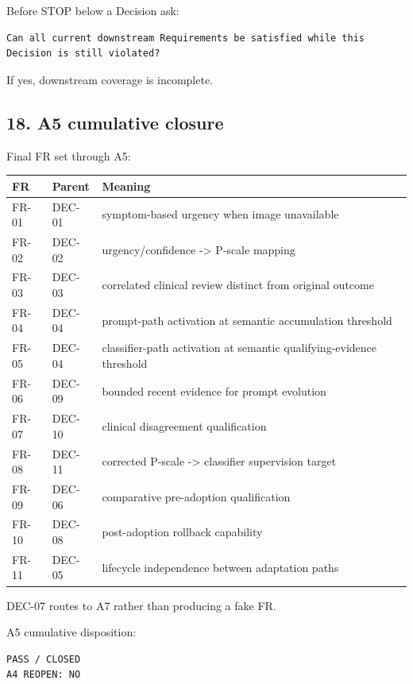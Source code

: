 \documentclass[11pt,a4paper]{article}
\begin{document}
Before STOP below a Decision ask:

\begin{verbatim}
Can all current downstream Requirements be satisfied while this Decision is still violated?
\end{verbatim}

If yes, downstream coverage is incomplete.

\subsection{18. A5 cumulative closure}\label{18-a5-cumulative-closure}

Final FR set through A5:

\begin{longtable}[]{@{}lll@{}}
\toprule\noalign{}
FR & Parent & Meaning \\
\midrule\noalign{}
\endhead
\bottomrule\noalign{}
\endlastfoot
FR-01 & DEC-01 & symptom-based urgency when image unavailable \\
FR-02 & DEC-02 & urgency/confidence -\textgreater{} P-scale mapping \\
FR-03 & DEC-03 & correlated clinical review distinct from original
outcome \\
FR-04 & DEC-04 & prompt-path activation at semantic accumulation
threshold \\
FR-05 & DEC-04 & classifier-path activation at semantic
qualifying-evidence threshold \\
FR-06 & DEC-09 & bounded recent evidence for prompt evolution \\
FR-07 & DEC-10 & clinical disagreement qualification \\
FR-08 & DEC-11 & corrected P-scale -\textgreater{} classifier
supervision target \\
FR-09 & DEC-06 & comparative pre-adoption qualification \\
FR-10 & DEC-08 & post-adoption rollback capability \\
FR-11 & DEC-05 & lifecycle independence between adaptation paths \\
\end{longtable}

DEC-07 routes to A7 rather than producing a fake FR.

A5 cumulative disposition:

\begin{verbatim}
PASS / CLOSED
A4 REOPEN: NO
\end{verbatim}
\end{document}
